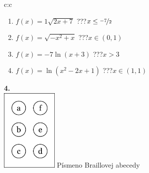 \documentclass[10pt]{report}
\begin{document}
\begin{tabular}{c:c}
\begin{minipage}[c][99mm][t]{0.49\linewidth}
\begin{center}
\begin{minipage}{0.77\linewidth}
\begin{center}
\begin{varwidth}{\textwidth}
\begin{enumerate}
\item $f(x)=1\sqrt{2x+7}$\quad \dotfill\; ???\;\dotfill \quad $x\leq\nicefrac{-7}{2}$
\item $f(x)=\sqrt{-x^2+x}$\quad \dotfill\; ???\;\dotfill \quad $x\in(0 , 1)$
\item $f(x)=-7\ln{(x+3)}$\quad \dotfill\; ???\;\dotfill \quad $x>3$
\item $f(x)=\ln{(x^2-2x+1)}$\quad \dotfill\; ???\;\dotfill \quad $x\in(1 , 1)$
\end{enumerate}
\end{varwidth}
\end{center}
\end{minipage}
\begin{minipage}{0.20\linewidth}
\begin{center}
{\Huge\bfseries 4.} \\[2mm]
\includegraphics[height=40mm]{../images/braille.png}
{\small Písmeno Braillovej abecedy}
\end{center}
\end{minipage}
\end{center}
\end{minipage}
%
\end{tabular}
\newpage
\thispagestyle{empty}
\end{document}
